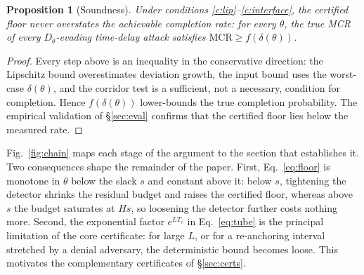 \documentclass[conference,letterpaper,10pt]{IEEEtran}   %
\newcommand{\MCR}{\mathrm{MCR}}
\newtheorem{proposition}{Proposition}
\begin{document}
\begin{proposition}[Soundness]
\label{prop:sound}
Under conditions \ref{c:lip}--\ref{c:interface}, the certified floor never
overstates the achievable completion rate: for every $\theta$, the true MCR of
every $D_\theta$-evading time-delay attack satisfies $\MCR\ge f(\delta(\theta))$.

\end{proposition}
\begin{proof}
Every step above is an inequality in the conservative direction: the Lipschitz
bound overestimates deviation growth, the input bound uses the worst-case
$\delta(\theta)$, and the corridor test is a sufficient, not a necessary, condition for
completion. Hence $f(\delta(\theta))$ lower-bounds the
true completion probability. The empirical validation of \S\ref{sec:eval}
confirms that the certified floor lies below the measured rate.
\end{proof}

Fig.~\ref{fig:chain} maps each stage of the argument to the section that
establishes it. Two consequences shape the remainder of the paper. First,
Eq.~\eqref{eq:floor} is monotone in $\theta$ below the slack $s$ and constant
above it: below $s$, tightening the detector shrinks the residual budget and
raises the certified floor, whereas above $s$ the budget saturates at $Hs$, so
loosening the detector further costs nothing more. Second, the exponential factor
$e^{LT_c}$ in Eq.~\eqref{eq:tube} is the principal limitation of the core
certificate: for large $L$, or for a re-anchoring interval stretched by a denial
adversary, the deterministic bound becomes loose. This motivates the
complementary certificates of \S\ref{sec:certs}.
\end{document}
